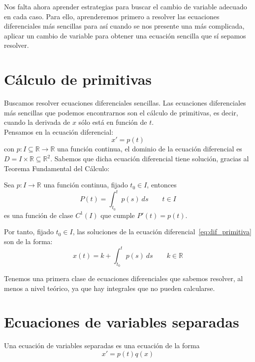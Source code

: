 Nos falta ahora aprender estrategias para buscar el cambio de variable adecuado en cada caso. Para ello, aprenderemos primero a resolver las ecuaciones diferenciales más sencillas para así cuando se nos presente una más complicada, aplicar un cambio de variable para obtener una ecuación sencilla que sí sepamos resolver.

\section{Cálculo de primitivas}
Buscamos resolver ecuaciones diferenciales sencillas. Las ecuaciones diferenciales más sencillas que podemos encontrarnos son el cálculo de primitivas, es decir, cuando la derivada de $x$ sólo está en función de $t$.\\

Pensamos en la ecuación diferencial:
\begin{equation}\label{eq:dif_primitiva}
    x' = p(t)
\end{equation}
con $p:I\subseteq \mathbb{R}\rightarrow\mathbb{R}$ una función continua, el dominio de la ecuación diferencial es $D = I\times \mathbb{R}\subseteq \mathbb{R}^2$. Sabemos que dicha ecuación diferencial tiene solución, gracias al Teorema Fundamental del Cálculo:

\begin{teo}
    Sea $p:I\rightarrow\mathbb{R}$ una función continua, fijado $t_0\in I$, entonces
    \begin{equation*}
        P(t) = \int_{t_0}^{t} p(s)~ds \qquad t\in I
    \end{equation*}
    es una función de clase $C^1(I)$ que cumple $P'(t) = p(t)$.
\end{teo}
Por tanto, fijado $t_0 \in I$, las soluciones de la ecuación diferencial~\ref{eq:dif_primitiva} son de la forma:
\begin{equation*}
    x(t) = k + \int_{t_0}^{t} p(s)~ds  \qquad k\in \mathbb{R}
\end{equation*}

Tenemos una primera clase de ecuaciones diferenciales que sabemos resolver, al menos a nivel teórico, ya que hay integrales que no pueden calcularse.

\section{Ecuaciones de variables separadas}
Una ecuación de variables separadas es una ecuación de la forma
\begin{equation*}
    x' = p(t) q(x)
\end{equation*}

